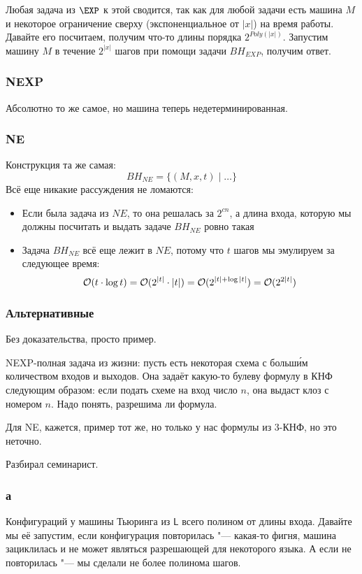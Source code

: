 		Любая задача из $\EXP$ к этой сводится, так как для любой задачи есть машина $M$
		и некоторое ограничение сверху (экспоненциальное от $|x|$) на время работы.
		Давайте его посчитаем, получим что-то длины порядка $2^{Poly(|x|)}$.
		Запустим машину $M$ в течение $2^{|x|}$ шагов при помощи задачи $BH_{EXP}$,
		получим ответ.

	\subsubsection{NEXP}
		Абсолютно то же самое, но машина теперь недетерминированная.

	\subsubsection{NE}
		Конструкция та же самая:
		\[ BH_{NE} = \{ (M, x, t) \mid \dots \} \]
		Всё еще никакие рассуждения не ломаются:
		\begin{itemize}
			\item Если была задача из $NE$, то она решалась за $2^{cn}$, а длина входа, которую мы должны посчитать и выдать задаче $BH_{NE}$ ровно такая
			\item Задача $BH_{NE}$ всё еще лежит в $NE$, потому что $t$ шагов мы эмулируем за следующее время:
				\[ \mathcal O(t \cdot \log t) = \mathcal O(2^{|t|} \cdot |t|) = \mathcal O(2^{|t|+\log |t|}) = \mathcal O(2^{2|t|}) \]
		\end{itemize}

	\subsubsection{Альтернативные}
		Без доказательства, просто пример.

		NEXP-полная задача из жизни: пусть есть некоторая схема с больш\'им количеством входов и выходов.
		Она задаёт какую-то булеву формулу в КНФ следующим образом: если подать схеме на вход число $n$,
		она выдаст клоз с номером $n$.
		Надо понять, разрешима ли формула.

		Для NE, кажется, пример тот же, но только у нас формулы из 3-КНФ, но это неточно.

	Разбирал семинарист.

	\subsubsection{а}
		Конфигураций у машины Тьюринга из $\mathsf{L}$ всего полином от длины входа.
		Давайте мы её запустим, если конфигурация повторилась "--- какая-то фигня, машина зациклилась и не может являться разрешающей для некоторого языка.
		А если не повторилась "--- мы сделали не более полинома шагов.

